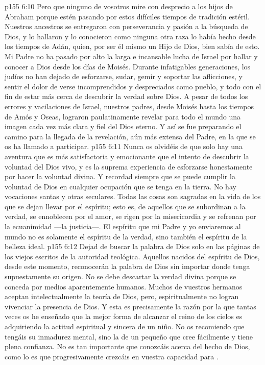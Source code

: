 \vs p155 6:10 Pero que ninguno de vosotros mire con desprecio a los hijos de Abraham porque estén pasando por estos difíciles tiempos de tradición estéril. Nuestros ancestros se entregaron con perseverancia y pasión a la búsqueda de Dios, y lo hallaron y lo conocieron como ninguna otra raza lo había hecho desde los tiempos de Adán, quien, por ser él mismo un Hijo de Dios, bien sabía de esto. Mi Padre no ha pasado por alto la larga e incansable lucha de Israel por hallar y conocer a Dios desde los días de Moisés. Durante infatigables generaciones, los judíos no han dejado de esforzarse, sudar, gemir y soportar las aflicciones, y sentir el dolor de verse incomprendidos y despreciados como pueblo, y todo con el fin de estar más cerca de descubrir la verdad sobre Dios. A pesar de todos los errores y vacilaciones de Israel, nuestros padres, desde Moisés hasta los tiempos de Amós y Oseas, lograron paulatinamente revelar para todo el mundo una imagen cada vez más clara y fiel del Dios eterno. Y así se fue preparando el camino para la llegada de la revelación, aún más extensa del Padre, en la que se os ha llamado a participar.
\vs p155 6:11 Nunca os olvidéis de que solo hay una aventura que es más satisfactoria y emocionante que el intento de descubrir la voluntad del Dios vivo, y es la suprema experiencia de esforzarse honestamente por hacer la voluntad divina. Y recordad siempre que se puede cumplir la voluntad de Dios en cualquier ocupación que se tenga en la tierra. No hay vocaciones santas y otras seculares. Todas las cosas son sagradas en la vida de los que se dejan llevar por el espíritu; esto es, de aquellos que se subordinan a la verdad, se ennoblecen por el amor, se rigen por la misericordia y se refrenan por la ecuanimidad ---la justicia---. El espíritu que mi Padre y yo enviaremos al mundo no es solamente el espíritu de la verdad, sino también el espíritu de la belleza ideal.
\vs p155 6:12 Dejad de buscar la palabra de Dios solo en las páginas de los viejos escritos de la autoridad teológica. Aquellos nacidos del espíritu de Dios, desde este momento, reconocerán la palabra de Dios sin importar donde tenga supuestamente su origen. No se debe descartar la verdad divina porque se conceda por medios aparentemente humanos. Muchos de vuestros hermanos aceptan intelectualmente la teoría de Dios, pero, espiritualmente no logran vivenciar la presencia de Dios. Y esta es precisamente la razón por la que tantas veces os he enseñado que la mejor forma de alcanzar el reino de los cielos es adquiriendo la actitud espiritual y sincera de un niño. No os recomiendo que tengáis su inmadurez mental, sino la  de un pequeño que cree fácilmente y tiene plena confianza. No es tan importante que conozcáis acerca del hecho de Dios, como lo es que progresivamente crezcáis en vuestra capacidad para .
